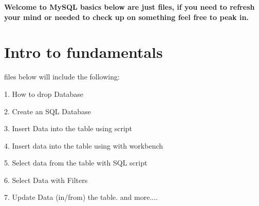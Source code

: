 \documentclass{article}
\begin{document}
	
\maketitle

\textbf{Welcome to MySQL basics below are just files, if you need to refresh your mind or needed to check up on something feel free to peak in.}
\section{Intro to fundamentals}
files below will include the following:

1. How to drop Database

2. Create an SQL Database

3. Insert Data into the table using script

4. Insert data into the table using with workbench

5. Select data from the table with SQL script

6. Select Data with Filters

7. Update Data (in/from) the table.
and more.... 
\end{document}
